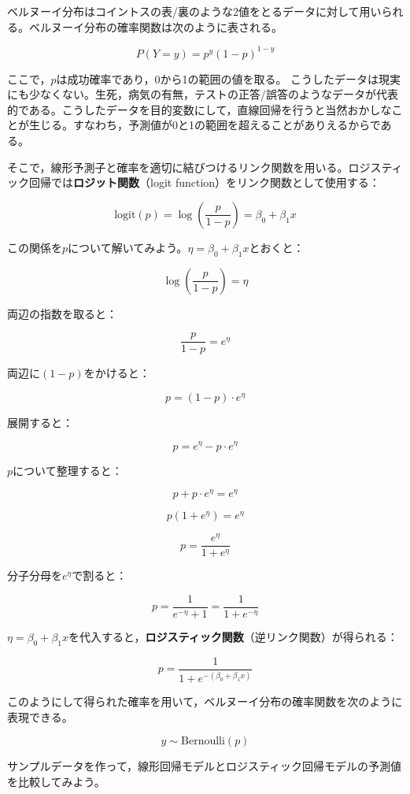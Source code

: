 \documentclass[
  a4paper,
]{ltjsbook}
\begin{document}
ベルヌーイ分布はコイントスの表/裏のような2値をとるデータに対して用いられる。ベルヌーイ分布の確率関数は次のように表される。

\[
P(Y = y) = p^y (1-p)^{1-y}
\]

ここで，\(p\)は成功確率であり，0から1の範囲の値を取る。
こうしたデータは現実にも少なくない。生死，病気の有無，テストの正答/誤答のようなデータが代表的である。こうしたデータを目的変数にして，直線回帰を行うと当然おかしなことが生じる。すなわち，予測値が0と1の範囲を超えることがありえるからである。

そこで，線形予測子と確率を適切に結びつけるリンク関数を用いる。ロジスティック回帰では\textbf{ロジット関数}（logit
function）をリンク関数として使用する：

\[
\text{logit}(p) = \log\left(\frac{p}{1-p}\right) = \beta_0 + \beta_1 x
\]

この関係を\(p\)について解いてみよう。\(\eta = \beta_0 + \beta_1 x\)とおくと：

\[
\log\left(\frac{p}{1-p}\right) = \eta
\]

両辺の指数を取ると：

\[
\frac{p}{1-p} = e^{\eta}
\]

両辺に\((1-p)\)をかけると：

\[
p = (1-p) \cdot e^{\eta}
\]

展開すると：

\[
p = e^{\eta} - p \cdot e^{\eta}
\]

\(p\)について整理すると：

\[
p + p \cdot e^{\eta} = e^{\eta}
\]

\[
p(1 + e^{\eta}) = e^{\eta}
\]

\[
p = \frac{e^{\eta}}{1 + e^{\eta}}
\]

分子分母を\(e^{\eta}\)で割ると：

\[
p = \frac{1}{e^{-\eta} + 1} = \frac{1}{1 + e^{-\eta}}
\]

\(\eta = \beta_0 + \beta_1 x\)を代入すると，\textbf{ロジスティック関数}（逆リンク関数）が得られる：

\[
p = \frac{1}{1 + e^{-(\beta_0 + \beta_1 x)}}
\]

このようにして得られた確率を用いて，ベルヌーイ分布の確率関数を次のように表現できる。

\[ y \sim \text{Bernoulli}(p) \]

サンプルデータを作って，線形回帰モデルとロジスティック回帰モデルの予測値を比較してみよう。
\end{document}
